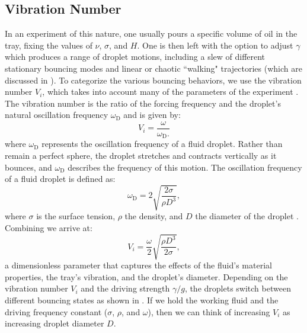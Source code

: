 \subsection{Vibration Number}

In an experiment of this nature, one usually pours a specific volume of oil in the tray, fixing the values of $\nu$, $\sigma$, and $H$. One is then left with the option to adjust $\gamma$ which produces a range of droplet motions, including a slew of different stationary bouncing modes and linear or chaotic ``walking" trajectories (which are discussed in ). To categorize the various bouncing behaviors, we use the vibration number $V_i$, which takes into account many of the parameters of the experiment . The vibration number is the ratio of the forcing frequency and the droplet's natural oscillation frequency $\omega_\mathrm{D}$ and is given by:
\begin{equation} \label{vibrationnumber1}
V_i = \frac{\omega}{\omega_\mathrm{D}.}
\end{equation}   
where $\omega_\mathrm{D}$ represents the oscillation frequency of a fluid droplet. Rather than remain a perfect sphere, the droplet stretches and contracts vertically as it bounces, and $\omega_\mathrm{D}$ describes the frequency of this motion. The oscillation frequency of a fluid droplet is defined as:
\begin{equation} \label{oscillationfrequency}
\omega_\mathrm{D} = 2\sqrt{\frac{2\sigma}{\rho D^3}},
\end{equation}   
where $\sigma$ is the surface tension, $\rho$ the density, and $D$ the diameter of the droplet . Combining  we arrive at:
\begin{equation} \label{vibrationnumber2}
V_i = \frac{\omega}{2}\sqrt{\frac{\rho D^3}{2\sigma}},
\end{equation}   	       	       
a dimensionless parameter that captures the effects of the fluid's material properties, the tray's vibration, and the droplet's diameter. Depending on the vibration number $V_i$ and the driving strength $\gamma/g$, the droplets switch between different bouncing states as shown in . If we hold the working fluid and the driving frequency constant ($\sigma$, $\rho$, and $\omega$), then we can think of increasing $V_i$ as increasing droplet diameter $D$. 
	    
